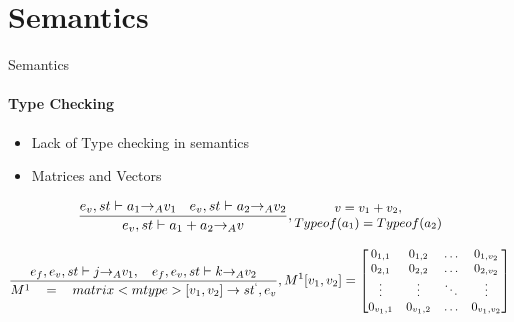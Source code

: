 \section{Semantics}

\begin{frame}{Semantics}
\framesubtitle{Type Checking}

\begin{itemize}
  \item Lack of Type checking in semantics
  \item Matrices and Vectors
\end{itemize}

\begin{equation}
\small
\frac { { e }_{ v },st\vdash { a }_{ 1 }{ \rightarrow  }_{ A }{ v }_{ 1 }\quad { e }_{ v },st\vdash { a }_{ 2 }{ \rightarrow  }_{ A }{ v }_{ 2 } }{ { e }_{ v },st\vdash { a }_{ 1 }+{ a }_{ 2 }{ \rightarrow  }_{ A }{ v } } ,\begin{matrix} v={ v }_{ 1 }+{ v }_{ 2 }, \\ Typeof({ a }_{ 1 }) = Typeof({ a }_{ 2 }) \end{matrix}
\end{equation}

\begin{equation}
\small
    \frac { { e }_{ f },{ e }_{ v },st\vdash j{ \rightarrow  }_{ A }{ v }_{ 1 },\quad { e }_{ f },{ e }_{ v },st\vdash k{ \rightarrow  }_{ A }{ v }_{ 2 } }{ { M }^{ 1 }\quad =\quad matrix<mtype>[{ v }_{ 1 },{ v }_{ 2 }]\rightarrow { st }^{ ` },{ e }_{ v } } ,{ M }^{ 1 }[{ v }_{ 1 },{ v }_{ 2 }]= \begin{bmatrix} { { 0 }_{ 1,1 } } & 0_{ 1,2 } & \dots  & { 0 }_{ { 1,{ v }_{ 2 } } } \\ 0_{ 2,1 } & 0_{ 2,2 } & \dots  & 0_{ 2,v_{ 2 } } \\ \vdots  & \vdots  & \ddots  & \vdots  \\ { 0 }_{ { v }_{ 1 },1 } & 0_{ v_{ 1 },2 } & \dots  & { 0 }_{ { v }_{ 1 },{ v }_{ 2 } } \end{bmatrix}
\end{equation}

\end{frame}


